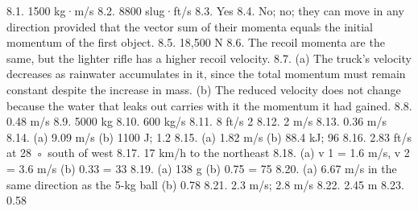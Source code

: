 8.1. 1500 kg·m/s
8.2. 8800 slug·ft/s
8.3. Yes
8.4. No; no; they can move in any direction provided that the vector sum of their momenta equals the initial momentum of the first object.
8.5. 18,500 N
8.6. The recoil momenta are the same, but the lighter rifle has a higher recoil velocity.
8.7. (a) The truck’s velocity decreases as rainwater accumulates in it, since the total momentum must remain constant despite the increase in mass.
    (b) The reduced velocity does not change because the water that leaks out carries with it the momentum it had gained.
8.8. 0.48 m/s
8.9. 5000 kg
8.10. 600 kg/s
8.11. 8 ft/s 2
8.12. 2 m/s
8.13. 0.36 m/s
8.14. (a) 9.09 m/s (b) 1100 J; 1.2%
8.15. (a) 1.82 m/s (b) 88.4 kJ; 96%
8.16. 2.83 ft/s at 28 ◦ south of west
8.17. 17 km/h to the northeast
8.18. (a) v 1 = 1.6 m/s, v 2 = 3.6 m/s (b) 0.33 = 33%
8.19. (a) 138 g (b) 0.75 = 75%
8.20. (a) 6.67 m/s in the same direction as the 5-kg ball (b) 0.78
8.21. 2.3 m/s; 2.8 m/s
8.22. 2.45 m
8.23. 0.58



\endinput

